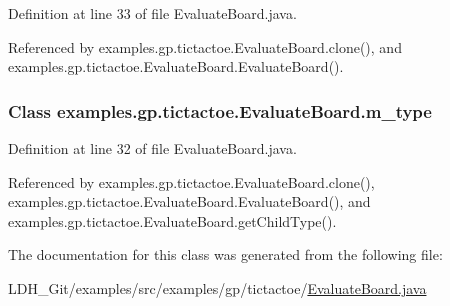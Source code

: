 Definition at line 33 of file Evaluate\-Board.\-java.



Referenced by examples.\-gp.\-tictactoe.\-Evaluate\-Board.\-clone(), and examples.\-gp.\-tictactoe.\-Evaluate\-Board.\-Evaluate\-Board().

\hypertarget{classexamples_1_1gp_1_1tictactoe_1_1_evaluate_board_ae9ffb194a6279b8a61499b73e99ae01e}{
\subsubsection[{m\-\_\-type}]{\setlength{\rightskip}{0pt plus 5cm}Class examples.\-gp.\-tictactoe.\-Evaluate\-Board.\-m\-\_\-type\hspace{0.3cm}{\ttfamily [private]}}}\label{classexamples_1_1gp_1_1tictactoe_1_1_evaluate_board_ae9ffb194a6279b8a61499b73e99ae01e}


Definition at line 32 of file Evaluate\-Board.\-java.



Referenced by examples.\-gp.\-tictactoe.\-Evaluate\-Board.\-clone(), examples.\-gp.\-tictactoe.\-Evaluate\-Board.\-Evaluate\-Board(), and examples.\-gp.\-tictactoe.\-Evaluate\-Board.\-get\-Child\-Type().



The documentation for this class was generated from the following file\-:\begin{DoxyCompactItemize}
\item 
L\-D\-H\-\_\-\-Git/examples/src/examples/gp/tictactoe/\hyperlink{_evaluate_board_8java}{Evaluate\-Board.\-java}\end{DoxyCompactItemize}
